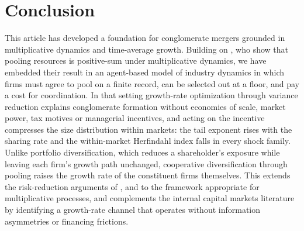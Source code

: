 \section{Conclusion}
\label{sec:Conclusion}

This article has developed a foundation for conglomerate mergers grounded in multiplicative dynamics and time-average growth. Building on \textcite{peters2022ergodicity}, who show that pooling resources is positive-sum under multiplicative dynamics, we have embedded their result in an agent-based model of industry dynamics in which firms must agree to pool on a finite record, can be selected out at a floor, and pay a cost for coordination. In that setting growth-rate optimization through variance reduction explains conglomerate formation without economies of scale, market power, tax motives or managerial incentives, and acting on the incentive compresses the size distribution within markets: the tail exponent rises with the sharing rate and the within-market Herfindahl index falls in every shock family. Unlike portfolio diversification, which reduces a shareholder's exposure while leaving each firm's growth path unchanged, cooperative diversification through pooling raises the growth rate of the constituent firms themselves. This extends the risk-reduction arguments of \textcite{amihud1981risk}, \textcite{lewellen1971pure} and \textcite{mueller1969theory} to the framework appropriate for multiplicative processes, and complements the internal capital markets literature \parencite{stein1997internal, gertner1994internal} by identifying a growth-rate channel that operates without information asymmetries or financing frictions.

